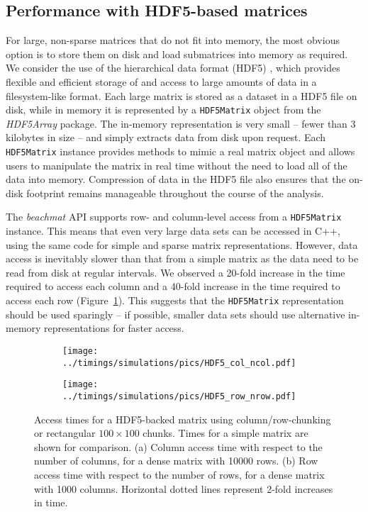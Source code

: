\documentclass[10pt,letterpaper]{article}
\newcommand{\beachmat}{\textit{beachmat}}
\newcommand{\code}[1]{\texttt{#1}}
\begin{document}
\subsection*{Performance with HDF5-based matrices}
For large, non-sparse matrices that do not fit into memory, the most obvious option is to store them on disk and load submatrices into memory as required.
We consider the use of the hierarchical data format (HDF5) \cite{hdf5}, which provides flexible and efficient storage of and access to large amounts of data in a filesystem-like format.
Each large matrix is stored as a dataset in a HDF5 file on disk, while in memory it is represented by a \code{HDF5Matrix} object from the \textit{HDF5Array} package.
The in-memory representation is very small -- fewer than 3 kilobytes in size -- and simply extracts data from disk upon request.
Each \code{HDF5Matrix} instance provides methods to mimic a real matrix object and allows users to manipulate the matrix in real time without the need to load all of the data into memory.
Compression of data in the HDF5 file also ensures that the on-disk footprint remains manageable throughout the course of the analysis.

The \beachmat{} API supports row- and column-level access from a \code{HDF5Matrix} instance.
This means that even very large data sets can be accessed in C++, using the same code for simple and sparse matrix representations.
However, data access is inevitably slower than that from a simple matrix as the data need to be read from disk at regular intervals.
We observed a 20-fold increase in the time required to access each column and a 40-fold increase in the time required to access each row (Figure~\ref{fig:hdf5time}).
This suggests that the \code{HDF5Matrix} representation should be used sparingly -- if possible, smaller data sets should use alternative in-memory representations for faster access.

\begin{figure}[bt]
    \begin{subfigure}[b]{0.49\textwidth}
        \texttt{[image: ../timings/simulations/pics/HDF5\_col\_ncol.pdf]}
        \caption{}
    \end{subfigure}
    \begin{subfigure}[b]{0.49\textwidth}
        \texttt{[image: ../timings/simulations/pics/HDF5\_row\_nrow.pdf]}
        \caption{}
    \end{subfigure}
    \caption{Access times for a HDF5-backed matrix using column/row-chunking or rectangular $100\times100$ chunks.
        Times for a simple matrix are shown for comparison.
        (a) Column access time with respect to the number of columns, for a dense matrix with 10000 rows.
        (b) Row access time with respect to the number of rows, for a dense matrix with 1000 columns.
        Horizontal dotted lines represent 2-fold increases in time.
    }
    \label{fig:hdf5time}
\end{figure}
\end{document}
